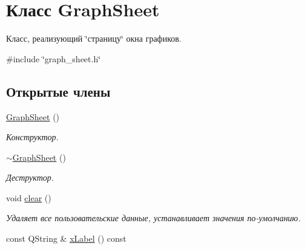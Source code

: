 \hypertarget{class_graph_sheet}{}\section{Класс Graph\+Sheet}
\label{class_graph_sheet}


Класс, реализующий \char`\"{}страницу\char`\"{} окна графиков.  




{\ttfamily \#include \char`\"{}graph\+\_\+sheet.\+h\char`\"{}}

\subsection*{Открытые члены}
\begin{DoxyCompactItemize}
\item 
\hyperlink{class_graph_sheet_aad9e497cfb489af37227147397ab021b}{Graph\+Sheet} ()\hypertarget{class_graph_sheet_aad9e497cfb489af37227147397ab021b}{}\label{class_graph_sheet_aad9e497cfb489af37227147397ab021b}

\begin{DoxyCompactList}\small\item\em Конструктор. \end{DoxyCompactList}\item 
\hyperlink{class_graph_sheet_ae4511be48b18851127b544cbf099d8e4}{$\sim$\+Graph\+Sheet} ()\hypertarget{class_graph_sheet_ae4511be48b18851127b544cbf099d8e4}{}\label{class_graph_sheet_ae4511be48b18851127b544cbf099d8e4}

\begin{DoxyCompactList}\small\item\em Деструктор. \end{DoxyCompactList}\item 
void \hyperlink{class_graph_sheet_a63677ef6de3a86eb27bef2ae91993a7c}{clear} ()\hypertarget{class_graph_sheet_a63677ef6de3a86eb27bef2ae91993a7c}{}\label{class_graph_sheet_a63677ef6de3a86eb27bef2ae91993a7c}

\begin{DoxyCompactList}\small\item\em Удаляет все пользовательские данные, устанавливает значения по-\/умолчанию. \end{DoxyCompactList}\item 
const Q\+String \& \hyperlink{class_graph_sheet_aba99f07178fd6c4a843b804c1320d1fb}{x\+Label} () const \hypertarget{class_graph_sheet_aba99f07178fd6c4a843b804c1320d1fb}{}\label{class_graph_sheet_aba99f07178fd6c4a843b804c1320d1fb}


\end{DoxyCompactItemize}
